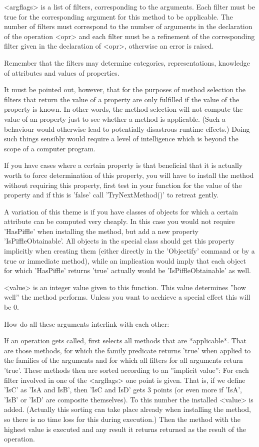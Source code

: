 <argflags> is a list of filters, corresponding to the arguments.
Each filter
must be true for the corresponding argument for this method to be
applicable. The number of filters must correspond to the number of arguments
in the declaration of the operation <opr> and each filter must be a refinement
of the corresponding filter given in the declaration of <opr>, otherwise an
error is raised.

Remember that the filters may determine categories, representations,
knowledge of attributes and values of properties.

\danger
It must be pointed out, however, that for the purposes of method selection
the filters that return the value of a property are only fulfilled if the
value of the property is known. In other words, the method selection will
not compute the value of an property just to see whether a method is
applicable. (Such a behaviour would otherwise lead to potentially disastrous
runtime effects.) Doing such things sensibly would require a level of
intelligence which is beyond the scope of a computer program. 

\danger
If you have cases where a certain property is that beneficial that
it is actually worth to force determination of this property, you will have
to install the method without requiring this property, first test in your
function for the value of the property and if this is 'false' call
'TryNextMethod()' to retreat gently.

\danger
A variation of this theme is if you have classes of objects for which
a certain attribute can be computed very cheaply. In this case you would not
require 'HasPiffle' when installing the method, but add a new property
'IsPiffleObtainable'. All objects in the special class should get this
property implicitly when creating them (either directly in the 'Objectify'
command or by a true or immediate method), while an implication would imply
that each object for which 'HasPiffle' returns 'true' actually would be
'IsPiffleObtainable' as well.

<value> is an integer value given to this function. This value determines
''how well'' the method performs. Unless you want to acchieve a special
effect this will be 0.

How do all these arguments interlink with each other:

If an operation gets called, {\GAP} first selects all methods that are
*applicable*. That are those methods, for which the family predicate
returns 'true' when applied to the families of the arguments and for which
all filters for all arguments return 'true'. These methods then are sorted
according to an ''implicit value'': For each filter involved in one of the
<argflags> one point is given. That is, if we define 'IsC' as 'IsA and
IsB', then 'IsC and IsD' gets 3 points (or even more if 'IsA', 'IsB' or
'IsD' are composite themselves).
To this number the installed <value> is
added.
(Actually this sorting can take place already when installing the method, so
there is no time loss for this during execution.)
Then the method with the highest value is executed and any result it returns
returned as the result of the operation.

